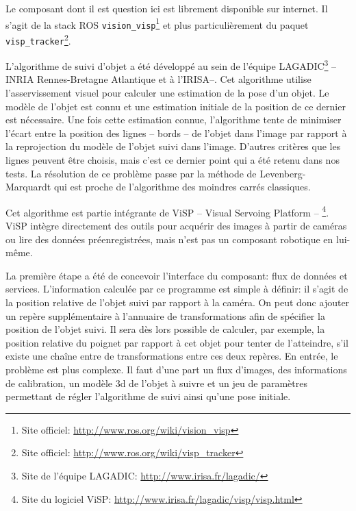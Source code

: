 Le composant dont il est question ici est librement disponible sur
internet. Il s'agit de la stack ROS
\texttt{vision\_visp}\footnote{Site officiel:
  \url{http://www.ros.org/wiki/vision_visp}} et plus particulièrement
du paquet \texttt{visp\_tracker}\footnote{Site officiel:
  \url{http://www.ros.org/wiki/visp_tracker}}.


L'algorithme de suivi d'objet a été développé au sein de l'équipe
LAGADIC\footnote{Site de l'équipe LAGADIC:
  \url{http://www.irisa.fr/lagadic/}} -- INRIA Rennes-Bretagne
Atlantique et à l'IRISA--. Cet algorithme utilise l'asservissement
visuel pour calculer une estimation de la pose d'un objet. Le modèle
de l'objet est connu et une estimation initiale de la position de ce
dernier est nécessaire. Une fois cette estimation connue, l'algorithme
tente de minimiser l'écart entre la position des lignes -- bords -- de
l'objet dans l'image par rapport à la reprojection du modèle de
l'objet suivi dans l'image. D'autres critères que les lignes peuvent
être choisis, mais c'est ce dernier point qui a été retenu dans nos
tests. La résolution de ce problème passe par la méthode de
Levenberg-Marquardt qui est proche de
l'algorithme des moindres carrés classiques.


Cet algorithme est partie intégrante de ViSP -- Visual Servoing
Platform -- \footnote{Site du logiciel ViSP:
  \url{http://www.irisa.fr/lagadic/visp/visp.html}}. ViSP intègre
directement des outils pour acquérir des images à partir de caméras ou
lire des données préenregistrées, mais n'est pas un composant
robotique en lui-même.


La première étape a été de concevoir l'interface du composant: flux de données
et services. L'information calculée par ce programme est simple à
définir: il s'agit de la position relative de l'objet suivi par
rapport à la caméra. On peut donc ajouter un repère supplémentaire à
l'annuaire de transformations afin de spécifier la position de l'objet
suivi. Il sera dès lors possible de calculer, par exemple, la position
relative du poignet par rapport à cet objet pour tenter de
l'atteindre, s'il existe une chaîne entre de transformations entre ces
deux repères. En entrée, le problème est plus complexe. Il faut d'une
part un flux d'images, des informations de calibration, un modèle 3d de
l'objet à suivre et un jeu de paramètres permettant de régler
l'algorithme de suivi ainsi qu'une pose initiale.

